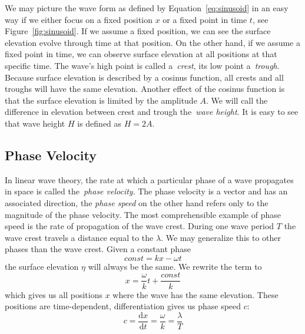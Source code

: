 We may picture the wave form as defined by Equation~\ref{eq:sinusoid} in an easy
way if we either focus on a fixed position $x$ or a fixed point in time $t$,
see Figure~\ref{fig:sinusoid}.
If we assume a fixed position, we can see the surface elevation evolve through
time at that position. On the other hand, if we assume a fixed point in time, we
can observe surface elevation at all positions at that specific time. The wave's
high point is called a~\emph{crest}, its low point a~\emph{trough}. Because
surface elevation is described by a cosinus function, all crests and all troughs
will have the same elevation. Another effect of the cosinus function is that the
surface elevation is limited by the amplitude $A$. We will call the difference
in elevation between crest and trough the~\emph{wave height}. It is easy to see
that wave height $H$ is defined as $H=2A$.
%
\subsection{Phase Velocity}
\label{sec:phase_velocity}
In linear wave theory, the rate at which a particular phase of a wave propagates in space is called
the~\emph{phase velocity}. The phase velocity is a vector and has an associated direction,
the \emph{phase speed} on the other hand refers only to the magnitude of the phase velocity.
The most comprehensible example of phase speed is the rate of propagation of the wave crest.
During one wave period $T$ the wave crest travels a distance equal to the \wavelength $\lambda$.
We may generalize this to other phases than the wave crest. Given a constant phase
\begin{equation*}
  const = kx - \omega t
\end{equation*}
the surface elevation $\eta$ will always be the same. We rewrite the term to
\begin{equation*}
  x = \frac{\omega}{k}t + \frac{const}{k}
\end{equation*}
which gives us all positions $x$ where the wave has the same elevation. These
positions are time-dependent, differentiation gives us phase speed $c$:
\begin{equation*}
  c = \frac{\mathrm dx}{\mathrm dt} = \frac{\omega}{k} = \frac{\lambda}{T}
\end{equation*}

